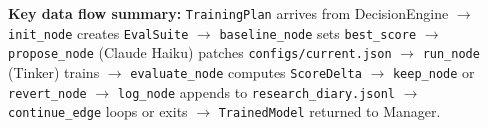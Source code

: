 \documentclass[11pt, letterpaper]{article}
\begin{document}
\vspace{1em}
\noindent\color{muted}\small
\textbf{Key data flow summary:}
\texttt{TrainingPlan} arrives from DecisionEngine $\to$
\texttt{init\_node} creates \texttt{EvalSuite} $\to$
\texttt{baseline\_node} sets \texttt{best\_score} $\to$
\texttt{propose\_node} (Claude Haiku) patches \texttt{configs/current.json} $\to$
\texttt{run\_node} (Tinker) trains $\to$
\texttt{evaluate\_node} computes \texttt{ScoreDelta} $\to$
\texttt{keep\_node} or \texttt{revert\_node} $\to$
\texttt{log\_node} appends to \texttt{research\_diary.jsonl} $\to$
\texttt{continue\_edge} loops or exits $\to$
\texttt{TrainedModel} returned to Manager.
\end{document}
